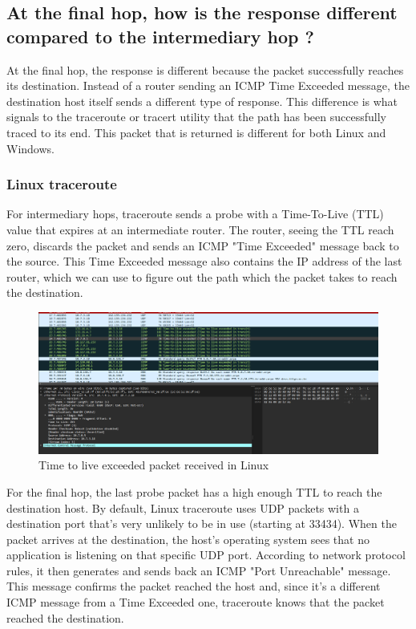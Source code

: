 \documentclass{article}
\begin{document}
\subsection{At the final hop, how is the response different compared to the intermediary hop ?}

At the final hop, the response is different because the packet successfully reaches its destination. Instead of a router sending an ICMP Time Exceeded message, the destination host itself sends a different type of response. This difference is what signals to the traceroute or tracert utility that the path has been successfully traced to its end. This packet that is returned is different for both Linux and Windows.

\subsubsection{Linux traceroute}
For intermediary hops, traceroute sends a probe with a Time-To-Live (TTL) value that expires at an intermediate router. The router, seeing the TTL reach zero, discards the packet and sends an ICMP "Time Exceeded" message back to the source. This Time Exceeded message also contains the IP address of the last router, which we can use to figure out the path which the packet takes to reach the destination.

\begin{figure}[H]
    \centering
    \includegraphics[width=1\linewidth]{ttl exceeded linux.png}
    \caption{Time to live exceeded packet received in Linux}
    \label{fig:placeholder}
\end{figure}

For the final hop, the last probe packet has a high enough TTL to reach the destination host. By default, Linux traceroute uses UDP packets with a destination port that's very unlikely to be in use (starting at 33434). When the packet arrives at the destination, the host's operating system sees that no application is listening on that specific UDP port. According to network protocol rules, it then generates and sends back an ICMP "Port Unreachable" message. This message confirms the packet reached the host and, since it's a different ICMP message from a Time Exceeded one, traceroute knows that the packet reached the destination.
\end{document}
